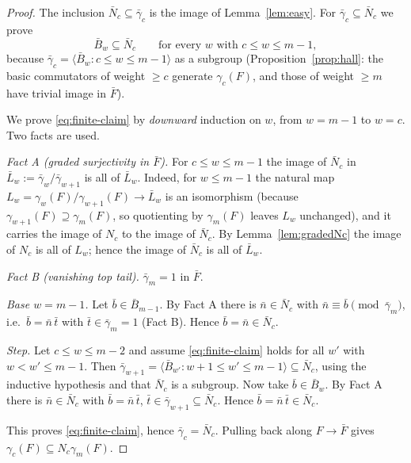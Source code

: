 \documentclass{amsart}
\theoremstyle{definition}
\theoremstyle{remark}
\begin{document}
\begin{proof}
The inclusion $\bar N_c\subseteq\bar\gamma_c$ is the image of Lemma~\ref{lem:easy}.
For $\bar\gamma_c\subseteq\bar N_c$ we prove
\begin{equation}\label{eq:finite-claim}
\bar B_w\subseteq\bar N_c\qquad\text{for every }w\text{ with }c\le w\le m-1,
\end{equation}
because $\bar\gamma_c=\langle\bar B_w:c\le w\le m-1\rangle$ as a subgroup
(Proposition~\ref{prop:hall}: the basic commutators of weight $\ge c$ generate
$\gamma_c(F)$, and those of weight $\ge m$ have trivial image in $\bar F$).

We prove \eqref{eq:finite-claim} by \emph{downward} induction on $w$, from $w=m-1$
to $w=c$. Two facts are used.

\emph{Fact A (graded surjectivity in $\bar F$).} For $c\le w\le m-1$ the image of
$\bar N_c$ in $\bar L_w:=\bar\gamma_w/\bar\gamma_{w+1}$ is all of $\bar L_w$. Indeed,
for $w\le m-1$ the natural map $L_w=\gamma_w(F)/\gamma_{w+1}(F)\to\bar L_w$ is an
isomorphism (because $\gamma_{w+1}(F)\supseteq\gamma_m(F)$, so quotienting by
$\gamma_m(F)$ leaves $L_w$ unchanged), and it carries the image of $N_c$ to the image
of $\bar N_c$. By Lemma~\ref{lem:gradedNc} the image of $N_c$ is all of $L_w$; hence
the image of $\bar N_c$ is all of $\bar L_w$.

\emph{Fact B (vanishing top tail).} $\bar\gamma_m=1$ in $\bar F$.

\emph{Base $w=m-1$.} Let $\bar b\in\bar B_{m-1}$. By Fact A there is
$\bar n\in\bar N_c$ with $\bar n\equiv\bar b\pmod{\bar\gamma_{m}}$, i.e.\
$\bar b=\bar n\,\bar t$ with $\bar t\in\bar\gamma_{m}=1$ (Fact B). Hence
$\bar b=\bar n\in\bar N_c$.

\emph{Step.} Let $c\le w\le m-2$ and assume \eqref{eq:finite-claim} holds for all
$w'$ with $w<w'\le m-1$. Then $\bar\gamma_{w+1}=\langle\bar B_{w'}:w+1\le w'\le
m-1\rangle\subseteq\bar N_c$, using the inductive hypothesis and that $\bar N_c$ is a
subgroup. Now take $\bar b\in\bar B_w$. By Fact A there is $\bar n\in\bar N_c$ with
$\bar b=\bar n\,\bar t$, $\bar t\in\bar\gamma_{w+1}\subseteq\bar N_c$. Hence
$\bar b=\bar n\,\bar t\in\bar N_c$.

This proves \eqref{eq:finite-claim}, hence $\bar\gamma_c=\bar N_c$. Pulling back
along $F\to\bar F$ gives $\gamma_c(F)\subseteq N_c\gamma_m(F)$.
\end{proof}
\end{document}
